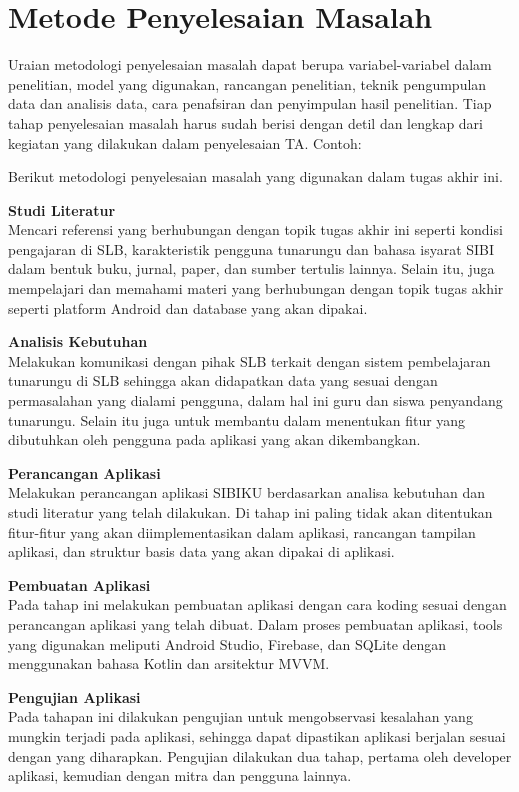 \documentclass[a4paper,11pt,oneside]{report}
\begin{document}
\section{Metode Penyelesaian Masalah}
Uraian metodologi penyelesaian masalah dapat berupa variabel-variabel dalam
penelitian, model yang digunakan, rancangan penelitian, teknik pengumpulan data
dan analisis data, cara penafsiran dan penyimpulan hasil penelitian. Tiap tahap
penyelesaian masalah harus sudah berisi dengan detil dan lengkap dari kegiatan
yang dilakukan dalam penyelesaian TA. Contoh:

Berikut metodologi penyelesaian masalah yang digunakan dalam tugas akhir ini.

\textbf{Studi Literatur}\\
Mencari referensi yang berhubungan dengan topik tugas akhir ini seperti kondisi
pengajaran di SLB, karakteristik pengguna tunarungu dan bahasa isyarat SIBI
dalam bentuk buku, jurnal, paper, dan sumber tertulis lainnya. Selain itu, juga
mempelajari dan memahami materi yang berhubungan dengan topik tugas akhir
seperti platform Android dan database yang akan dipakai.

\textbf{Analisis Kebutuhan}\\
Melakukan komunikasi dengan pihak SLB terkait dengan sistem pembelajaran
tunarungu di SLB sehingga akan didapatkan data yang sesuai dengan permasalahan
yang dialami pengguna, dalam hal ini guru dan siswa penyandang tunarungu. Selain
itu juga untuk membantu dalam menentukan fitur yang dibutuhkan oleh pengguna
pada aplikasi yang akan dikembangkan.

\textbf{Perancangan Aplikasi}\\
Melakukan perancangan aplikasi SIBIKU berdasarkan analisa kebutuhan dan studi
literatur yang telah dilakukan. Di tahap ini paling tidak akan ditentukan
fitur-fitur yang akan diimplementasikan dalam aplikasi, rancangan tampilan
aplikasi, dan struktur basis data yang akan dipakai di aplikasi.

\textbf{Pembuatan Aplikasi}\\
Pada tahap ini melakukan pembuatan aplikasi dengan cara koding sesuai dengan
perancangan aplikasi yang telah dibuat. Dalam proses pembuatan aplikasi, tools
yang digunakan meliputi Android Studio, Firebase, dan SQLite dengan menggunakan
bahasa Kotlin dan arsitektur MVVM.

\textbf{Pengujian Aplikasi}\\
Pada tahapan ini dilakukan pengujian untuk mengobservasi kesalahan yang mungkin
terjadi pada aplikasi, sehingga dapat dipastikan aplikasi berjalan sesuai dengan
yang diharapkan. Pengujian dilakukan dua tahap, pertama oleh developer aplikasi,
kemudian dengan mitra dan pengguna lainnya.
\end{document}
